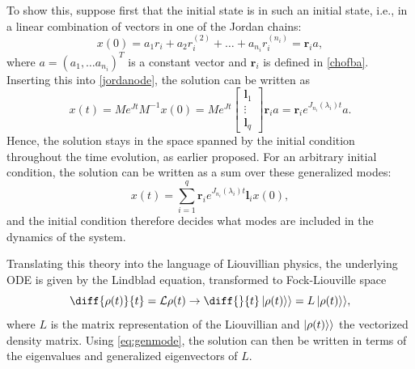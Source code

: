 \documentclass[../main.tex]{subfiles}
\begin{document}
To show this, suppose first that the initial state is in such an initial state, i.e., in a linear combination of vectors in one of the Jordan chains:
\begin{equation}
    x(0) = a_1r_i + a_2r_i^{(2)} + \dots + a_{n_i}r_i^{(n_i)} = \boldsymbol{r}_ia,
\end{equation}
where $a = (a_1, \dots a_{n_i})^T$ is a constant vector and $\boldsymbol{r}_i$ is defined in \cref{chofba}. Inserting this into \cref{jordanode}, the solution can be written as
\begin{equation}
    x(t) = Me^{Jt}M^{-1}x(0) = Me^{Jt} \begin{bmatrix} \boldsymbol{l}_1 \\ \vdots \\ \boldsymbol{l}_{q} \end{bmatrix} \boldsymbol{r}_ia = \boldsymbol{r}_i e^{J_{n_i}(\lambda_i)t} a.
\end{equation}
Hence, the solution stays in the space spanned by the initial condition throughout the time evolution, as earlier proposed. For an arbitrary initial condition, the solution can be written as a sum over these generalized modes: 
\begin{equation}\label{eq:genmode}
    x(t) = \sum_{i=1}^q \boldsymbol{r}_i e^{J_{n_i}(\lambda_i)t} \boldsymbol{l}_i x(0),
\end{equation}
and the initial condition therefore decides what modes are included in the dynamics of the system.

Translating this theory into the language of Liouvillian physics, the underlying ODE is given by the Lindblad equation, transformed to Fock-Liouville space    
\begin{equation}\label{eq:lindfock}
    \diff{\rho(t)}{t}= \mathcal{L} \rho(t) \rightarrow \diff{}{t}\ket{\rho(t)}\rangle = L \ket{\rho(t)}\rangle,
\end{equation}
where $L$ is the matrix representation of the Liouvillian and $\ket{\rho(t)}\rangle$ the vectorized density matrix. Using \cref{eq:genmode}, the solution can then be written in terms of the eigenvalues and generalized eigenvectors of $L$.
\end{document}
